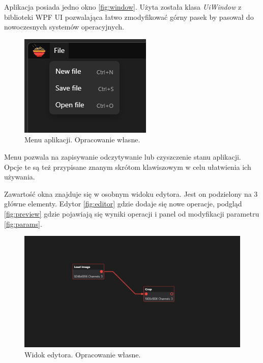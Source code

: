 Aplikacja posiada jedno okno \autoref{fig:window}. 
Użyta została klasa \textit{UiWindow} z biblioteki WPF UI pozwalająca łatwo zmodyfikować górny pasek by pasował do nowoczesnych systemów operacyjnych. 

\begin{figure}[H]
    \centering
    \includegraphics[width=0.6\linewidth]{images/Picture14.png}
    \caption{Menu aplikacji. Opracowanie własne.}
    \label{fig:mainmenu}
\end{figure}

Menu pozwala na zapisywanie odczytywanie lub czyszczenie stanu aplikacji. 
Opcje te są też przypisane znanym skrótom klawiszowym w celu ułatwienia ich używania.

Zawartość okna znajduje się w osobnym widoku edytora. Jest on podzielony na 3 główne elementy. Edytor \autoref{fig:editor} gdzie dodaje się nowe operacje, podgląd \autoref{fig:preview} gdzie pojawiają się wyniki operacji i panel od modyfikacji parametru \autoref{fig:params}.

\begin{figure}[H]
    \centering
    \includegraphics[width=1\linewidth]{images/Picture15.png}
    \caption{Widok edytora. Opracowanie własne.}
    \label{fig:editor}
\end{figure}

